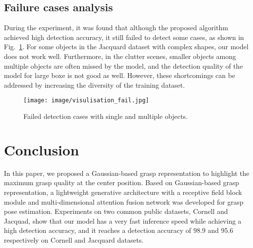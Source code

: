 \documentclass[journal]{IEEEtran}
\begin{document}
\subsection{Failure cases analysis}
During the experiment, it was found that although the proposed algorithm achieved high detection accuracy, it still failed to detect some cases, as shown in Fig.~\ref{fig:failure}. For some objects in the Jacquard dataset with complex shapes, our model does not work well. Furthermore, in the clutter scenes, smaller objects among multiple objects are often missed by the model, and the detection quality of the model for large boxe is not good as well. However, these shortcomings can be addressed by increasing the diversity of the training dataset.



\begin{figure}[t!]
	\centering  
	\texttt{[image: image/visulisation\_fail.jpg]}
	\caption{Failed detection cases with single and multiple objects.}
	\label{fig:failure}
\end{figure}



\section{Conclusion}

In this paper, we proposed a Gaussian-based grasp representation to highlight the maximum grasp quality at the center position. Based on Gaussian-based grasp representation, a lightweight generative architecture with a receptive field block module and multi-dimensional attention fusion network was developed for grasp pose estimation. Experiments on two common public datasets, Cornell and Jacquad, show that our model has a very fast inference speed while achieving a high detection accuracy, and it reaches a detection accuracy of 98.9 and 95.6 respectively on Cornell and Jacquard datasets.







\end{document}
